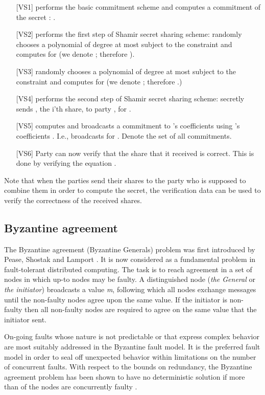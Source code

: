 \documentclass[10pt]{svjour3}
\begin{document}
\begin{itemize}
\item [{[VS1]}]  performs the basic commitment scheme and computes a
  commitment of the secret : .
\item [{[VS2]}]  performs the first step of Shamir secret sharing
  scheme:  randomly chooses a polynomial  of degree at most
   subject to the constraint  and computes  for  (we
  denote ; therefore ).
\item [{[VS3]}]  randomly chooses a polynomial  of degree at
  most   subject to the constraint
  and computes  for  (we
  denote ; therefore .)
\item [{[VS4]}]  performs the second step of Shamir secret sharing
  scheme:  secretly sends , the i'th share, to party
  , for .
\item [{[VS5]}]  computes and broadcasts a commitment to 's
  coefficients
   using 's coefficients
  . I.e.,  
  broadcasts  for .
 Denote  the set of all
 commitments.
\item [{[VS6]}] Party  can now  verify that the  share 
  that
  it received is correct. This is done by verifying the equation
.


\end{itemize}
Note that when the parties send their shares to the party who is
supposed to combine them in order to compute the secret, the
verification  data  can  be used
to verify the correctness of the received shares.







\subsection{Byzantine agreement}
\label{agreement}


The Byzantine agreement (Byzantine Generals)
problem was first introduced by Pease, Shostak and Lamport
\cite{Agree80}. It is now considered as a fundamental problem in
fault-tolerant distributed computing. The task is to reach agreement
in a set of  nodes in which up-to  nodes may be faulty. A
distinguished node (\emph{the General} or \emph{the initiator})
broadcasts a value \emph{m}, following which all nodes exchange
messages until the non-faulty nodes agree upon the same value. If
the initiator is non-faulty then all non-faulty nodes are required
to agree on the same value that the initiator sent.

On-going faults whose nature is not predictable or that
express complex behavior are most suitably addressed in the
Byzantine fault model. It is the preferred fault model in order to
seal off unexpected behavior within limitations on the number of
concurrent faults. With respect to the bounds on redundancy, the
Byzantine agreement problem has been shown to have no deterministic
solution if more than  of the nodes are concurrently faulty
\cite{Agree82}.
\end{document}
